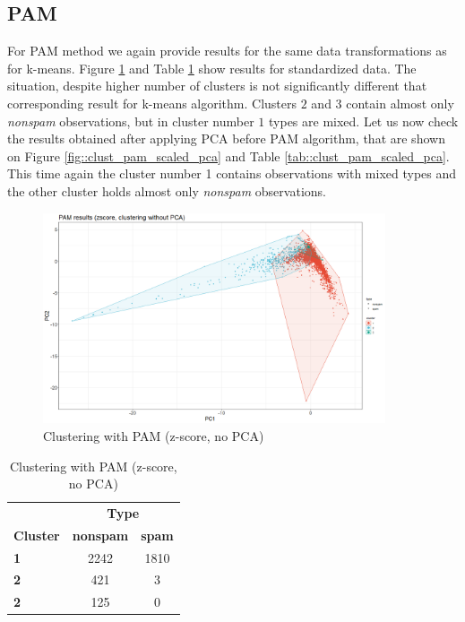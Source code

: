 \documentclass{article}
\begin{document}
	\subsection{PAM}
	For PAM method we again provide results for the same data transformations as for k-means. Figure \ref{fig::clust_pam_scaled} and Table \ref{tab::clust_pam_scaled} show results for standardized data. The situation, despite higher number of clusters is not significantly different that corresponding result for k-means algorithm. Clusters $2$ and $3$ contain almost only \textit{nonspam} observations, but in cluster number $1$ types are mixed. Let us now check the results obtained after applying PCA before PAM algorithm, that are shown on Figure \ref{fig::clust_pam_scaled_pca} and Table \ref{tab::clust_pam_scaled_pca}. This time again the cluster number 1 contains observations with mixed types and the other cluster holds almost only \textit{nonspam} observations.
	
	\begin{figure}[h]
		\centering
		\includegraphics[width=0.9\textwidth]{proj2_plots/pam_res_scaled.png}
		\caption{Clustering with PAM (z-score, no PCA)}
		\label{fig::clust_pam_scaled}
	\end{figure}
	
	\begin{table}[h]
		\centering
		\begin{tabular}{lcc}
			& \multicolumn{2}{c}{\textbf{Type}} \\
			\textbf{Cluster} & \textbf{nonspam} & \textbf{spam} \\
			\textbf{1} & 2242 & 1810 \\
			\textbf{2} & 421 & 3 \\
			\textbf{2} & 125 & 0 \\
		\end{tabular}
		\caption{Clustering with PAM (z-score, no PCA)}
		\label{tab::clust_pam_scaled}
	\end{table}
	
\end{document}
